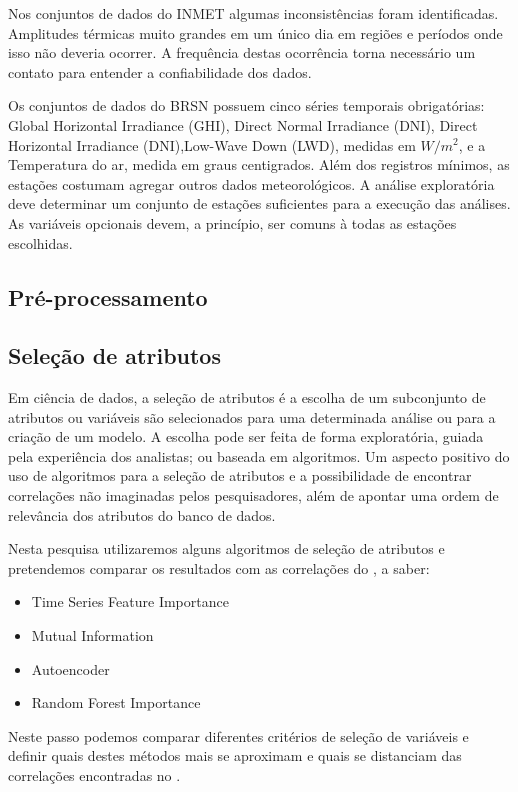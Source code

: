 Nos conjuntos de dados do INMET algumas inconsistências foram identificadas. Amplitudes térmicas muito grandes em um único dia em regiões e períodos onde isso não deveria ocorrer. A frequência destas ocorrência torna necessário um contato para entender a confiabilidade dos dados.

Os conjuntos de dados do BRSN possuem cinco séries temporais obrigatórias: Global Horizontal Irradiance (GHI), Direct Normal Irradiance (DNI), Direct Horizontal Irradiance (DNI),Low-Wave Down (LWD), medidas em $W/m^2$, e a Temperatura do ar, medida em graus centigrados. Além dos registros mínimos, as estações costumam agregar outros dados meteorológicos. A análise exploratória deve determinar um conjunto de estações suficientes para a execução das análises. As variáveis opcionais devem, a princípio, ser comuns à todas as estações escolhidas.

\subsection{Pré-processamento}



\subsection{Seleção de atributos}

Em ciência de dados, a seleção de atributos é a escolha de um subconjunto de atributos ou variáveis são selecionados para uma determinada análise ou para a criação de um modelo. A escolha pode ser feita de forma exploratória, guiada pela experiência dos analistas; ou baseada em algoritmos. Um aspecto positivo do uso de algoritmos para a seleção de atributos e a possibilidade de encontrar correlações não imaginadas pelos pesquisadores, além de apontar uma ordem de relevância dos atributos do banco de dados.

Nesta pesquisa utilizaremos alguns algoritmos de seleção de atributos e pretendemos comparar os resultados com as correlações do \dmc, a saber:

\begin{itemize}
    \item Time Series Feature Importance
    \item Mutual Information
    \item Autoencoder
    \item Random Forest Importance
\end{itemize}

Neste passo podemos comparar diferentes critérios de seleção de variáveis e definir quais destes métodos mais se aproximam e quais se distanciam das correlações encontradas no \dmc.

